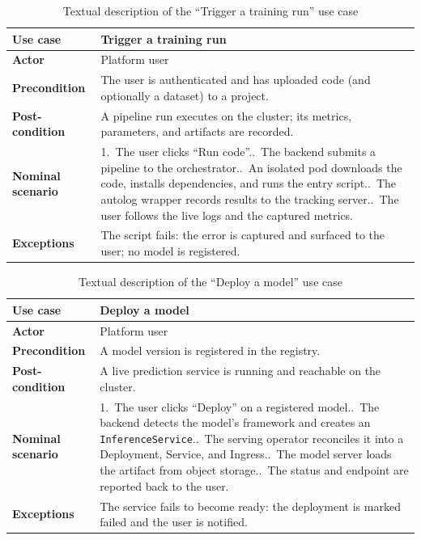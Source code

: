 \begin{table}[H]\centering
\renewcommand{\arraystretch}{1.2}
\caption{Textual description of the ``Trigger a training run'' use case}\label{tab:uc-train}
\begin{tabularx}{\textwidth}{|>{\bfseries}p{3.2cm}|X|}
\hline
Use case & Trigger a training run\\ \hline
Actor & Platform user\\ \hline
Precondition & The user is authenticated and has uploaded code (and optionally a dataset) to a project.\\ \hline
Post-condition & A pipeline run executes on the cluster; its metrics, parameters, and artifacts are recorded.\\ \hline
Nominal scenario & 1.~The user clicks ``Run code''.\newline 2.~The backend submits a pipeline to the orchestrator.\newline 3.~An isolated pod downloads the code, installs dependencies, and runs the entry script.\newline 4.~The autolog wrapper records results to the tracking server.\newline 5.~The user follows the live logs and the captured metrics.\\ \hline
Exceptions & The script fails: the error is captured and surfaced to the user; no model is registered.\\ \hline
\end{tabularx}
\end{table}

\begin{table}[H]\centering
\renewcommand{\arraystretch}{1.2}
\caption{Textual description of the ``Deploy a model'' use case}\label{tab:uc-deploy}
\begin{tabularx}{\textwidth}{|>{\bfseries}p{3.2cm}|X|}
\hline
Use case & Deploy a model\\ \hline
Actor & Platform user\\ \hline
Precondition & A model version is registered in the registry.\\ \hline
Post-condition & A live prediction service is running and reachable on the cluster.\\ \hline
Nominal scenario & 1.~The user clicks ``Deploy'' on a registered model.\newline 2.~The backend detects the model's framework and creates an \texttt{InferenceService}.\newline 3.~The serving operator reconciles it into a Deployment, Service, and Ingress.\newline 4.~The model server loads the artifact from object storage.\newline 5.~The status and endpoint are reported back to the user.\\ \hline
Exceptions & The service fails to become ready: the deployment is marked failed and the user is notified.\\ \hline
\end{tabularx}
\end{table}

